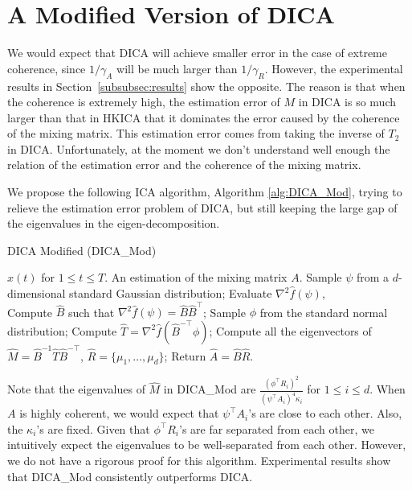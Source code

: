 \section{A Modified Version of DICA}
\label{subsec:modifiedDICA}
We would expect that DICA will achieve smaller error in the case of extreme coherence, since $1/\gamma_A$ will be much larger than $1/\gamma_R$. 
However, the experimental results in Section~\ref{subsubsec:results} show the opposite.  
The reason is that when the coherence is extremely high, the estimation
error of $M$ in DICA is so much larger than that in HKICA that it
dominates the error caused by the coherence of the mixing matrix.
This estimation error comes from taking the inverse of $T_2$ in DICA. 
Unfortunately, at the moment we don't understand well enough the relation of the estimation error and the coherence of the mixing matrix.

We propose the following ICA algorithm, Algorithm \ref{alg:DICA_Mod}, trying to relieve the estimation error problem of DICA, but still keeping the large gap of the eigenvalues in the eigen-decomposition. 
\begin{algorithm} 
\caption{DICA Modified (DICA\_Mod)}
\label{alg:DICA_Mod}
\begin{algorithmic}[1]
\INPUT $x(t)$ for $1\le t \le T$. 
\OUTPUT An estimation of the mixing matrix $A$. 
\STATE Sample $\psi$ from a $d$-dimensional standard Gaussian distribution;
\STATE Evaluate $\nabla^2\hat{f}(\psi)$, \\
\STATE Compute $\hat{B}$ such that $\nabla^2\hat{f}(\psi) = \hat{B}\hat{B}^{\top}$;
\STATE Sample $\phi$ from the standard normal distribution;
\STATE Compute $\hat{T} = \nabla^2 \hat{f}(\hat{B}^{-\top}\phi)$;
\STATE Compute all the eigenvectors of $\hat{M} = \hat{B}^{-1}\hat{T}\hat{B}^{-\top}$, $\hat{R} = \{\mu_1,\ldots,\mu_d\}$;
\STATE Return $\hat{A} = \hat{B}\hat{R}$.
\end{algorithmic}
\end{algorithm}
\begin{remark}
\label{rmk:DICA_Mod}
Note that the eigenvalues of $\hat{M}$ in DICA\_Mod are $\frac{(\phi^{\top}R_i)^2}{(\psi^{\top}A_i)^4\kappa_i}$ for $1\le i\le d$. 
When $A$ is highly coherent, we would expect that $\psi^{\top}A_i$'s are close to each other. Also, the $\kappa_i$'s are fixed. 
Given that $\phi^{\top}R_i$'s are far separated from each other, we intuitively expect the eigenvalues to be well-separated from each other. 
However, we do not have a rigorous proof for this algorithm.
Experimental results show that DICA\_Mod consistently outperforms DICA. 
\end{remark}


